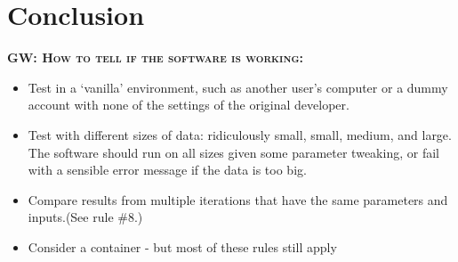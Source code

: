 \documentclass[10pt]{article}
\newcommand{\fixme}[2]{\textsc{\textbf{{#1}: {#2}}}}
\begin{document}
\section*{Conclusion}

\fixme{GW}{How to tell if the software is working:}

\begin{itemize}
\item
  Test in a `vanilla' environment, such as another user's computer or a
  dummy account with none of the settings of the original developer.
\item
  Test with different sizes of data: ridiculously small, small, medium,
  and large. The software should run on all sizes given some parameter
  tweaking, or fail with a sensible error message if the data is too
  big.
\item
  Compare results from multiple iterations that have the same parameters
  and inputs.(See rule \#8.)
\item
  Consider a container - but most of these rules still apply
\end{itemize}


\end{document}
